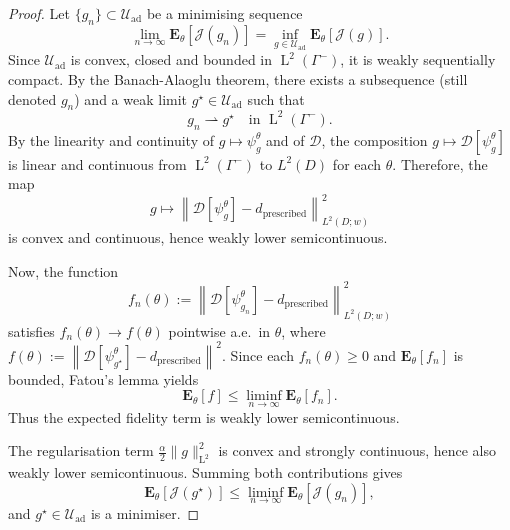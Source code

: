 \documentclass{amsart}
\theoremstyle{plain}
\newcommand{\leb}{\text{Leb}}
\newcommand{\LL}{\ensuremath{\operatorname L}\xspace}
\renewcommand{\leb}[1]{\ensuremath{\LL^{#1}}}
\begin{document}
\begin{proof}
  Let $\{ g_n \} \subset \mathcal{U}_{\mathrm{ad}}$ be a minimising sequence
  \begin{equation}
    \lim_{n \to \infty} \mathbf{E}_\theta\left[ \mathcal{J}(g_n) \right]
    = \inf_{g \in \mathcal{U}_{\mathrm{ad}}} \mathbf{E}_\theta\left[ \mathcal{J}(g) \right].
  \end{equation}
  Since $\mathcal{U}_{\mathrm{ad}}$ is convex, closed and bounded in
  $\leb2(\Gamma^-)$, it is weakly sequentially compact. By the
  Banach-Alaoglu theorem, there exists a subsequence (still denoted
  $g_n$) and a weak limit $g^\star \in \mathcal{U}_{\mathrm{ad}}$ such
  that
  \begin{equation}
    g_n \rightharpoonup g^\star \quad \text{in } \leb2(\Gamma^-).
  \end{equation}
  By the linearity and continuity of $g \mapsto \psi_g^\theta$ and of
  $\mathcal{D}$, the composition $g \mapsto
  \mathcal{D}[\psi_g^\theta]$ is linear and continuous from
  $\leb2(\Gamma^-)$ to $L^2(D)$ for each $\theta$. Therefore, the map
  \begin{equation}
    g \mapsto \left\| \mathcal{D}[\psi_g^\theta] - d_{\mathrm{prescribed}} \right\|^2_{L^2(D; w)}
  \end{equation}
  is convex and continuous, hence weakly lower semicontinuous.

  Now, the function
  \begin{equation}
    f_n(\theta) := \left\| \mathcal{D}[\psi_{g_n}^\theta] - d_{\mathrm{prescribed}} \right\|^2_{L^2(D; w)}
  \end{equation}
  satisfies $f_n(\theta) \to f(\theta)$ pointwise a.e.\ in $\theta$,
  where $f(\theta) := \left\| \mathcal{D}[\psi_{g^\star}^\theta] -
  d_{\mathrm{prescribed}} \right\|^2$. Since each $f_n(\theta) \geq 0$
  and $\mathbf{E}_\theta[f_n]$ is bounded, Fatou's lemma yields 
  \begin{equation}
    \mathbf{E}_\theta[f] \leq \liminf_{n \to \infty} \mathbf{E}_\theta[f_n].
  \end{equation}
  Thus the expected fidelity term is weakly lower semicontinuous.

  The regularisation term $\frac{\alpha}{2} \| g \|^2_{\leb2}$ is
  convex and strongly continuous, hence also weakly lower
  semicontinuous. Summing both contributions gives
  \begin{equation}
    \mathbf{E}_\theta[ \mathcal{J}(g^\star) ] \leq \liminf_{n \to \infty} \mathbf{E}_\theta[ \mathcal{J}(g_n) ],
  \end{equation}
  and $g^\star \in \mathcal{U}_{\mathrm{ad}}$ is a minimiser.
\end{proof}
\end{document}
